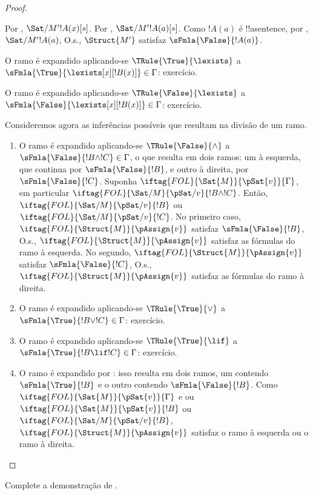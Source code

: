 \documentclass[../../../include/open-logic-section]{subfiles}
\begin{document}
\begin{proof}
\begin{enumerate}
{  Por , $\Sat/{M'}{!A(x)}[s]$. Por
  , $\Sat/{M'}{!A(a)}[s]$. Como
  $!A(a)$ é !!a{sentence}, por
  , $\Sat/{M'}{!A(a)}$, O.s.\@,
  $\Struct{M'}$ satisfaz $\sFmla{\False}{!A(a)}$.
\item O ramo é expandido aplicando-se $\TRule{\True}{\lexists}$ a
  $\sFmla{\True}{\lexists[x][!B(x)]} \in \Gamma$: exercício.
\item O ramo é expandido aplicando-se $\TRule{\False}{\lexists}$ a
  $\sFmla{\False}{\lexists[x][!B(x)]} \in \Gamma$: exercício.}{}
\end{enumerate}
Consideremos agora as inferências possíveis que resultam na divisão de um ramo.
\begin{enumerate}
\item O ramo é expandido aplicando-se $\TRule{\False}{\land}$ a
  $\sFmla{\False}{!B \land !C} \in \Gamma$, o que resulta em dois
  ramos: um à esquerda, que continua por $\sFmla{\False}{!B}$, e outro
  à direita, por $\sFmla{\False}{!C}$. Suponha
  $\iftag{FOL}{\Sat{M}}{\pSat{v}}{\Gamma}$, em particular
  $\iftag{FOL}{\Sat/{M}}{\pSat/{v}}{!B \land !C}$. Então,
  $\iftag{FOL}{\Sat/{M}}{\pSat/{v}}{!B}$ ou
  $\iftag{FOL}{\Sat/{M}}{\pSat/{v}}{!C}$. No primeiro caso,
  $\iftag{FOL}{\Struct{M}}{\pAssign{v}}$ satisfaz
  $\sFmla{\False}{!B}$, O.s.\@, $\iftag{FOL}{\Struct{M}}{\pAssign{v}}$
  satisfaz as fórmulas do ramo à esquerda. No segundo,
  $\iftag{FOL}{\Struct{M}}{\pAssign{v}}$ satisfaz
  $\sFmla{\False}{!C}$, O.s.\@, $\iftag{FOL}{\Struct{M}}{\pAssign{v}}$
  satisfaz as fórmulas do ramo à direita.
\item O ramo é expandido aplicando-se $\TRule{\True}{\lor}$ a
  $\sFmla{\True}{!B \lor !C} \in \Gamma$: exercício.
\item O ramo é expandido aplicando-se $\TRule{\True}{\lif}$ a
  $\sFmla{\True}{!B \lif !C} \in \Gamma$: exercício.
\item O ramo é expandido por \Cut: isso resulta em dois ramos,
  um contendo $\sFmla{\True}{!B}$ e o outro contendo
  $\sFmla{\False}{!B}$. Como $\iftag{FOL}{\Sat{M}}{\pSat{v}}{\Gamma}$
  e ou $\iftag{FOL}{\Sat{M}}{\pSat{v}}{!B}$ ou
  $\iftag{FOL}{\Sat/{M}}{\pSat/{v}}{!B}$,
  $\iftag{FOL}{\Struct{M}}{\pAssign{v}}$ satisfaz o ramo à esquerda ou
  o ramo à direita.
\end{enumerate}
\end{proof}

\begin{prob}
Complete a demonstração de .
\end{prob}
\tagendprob
\end{document}
